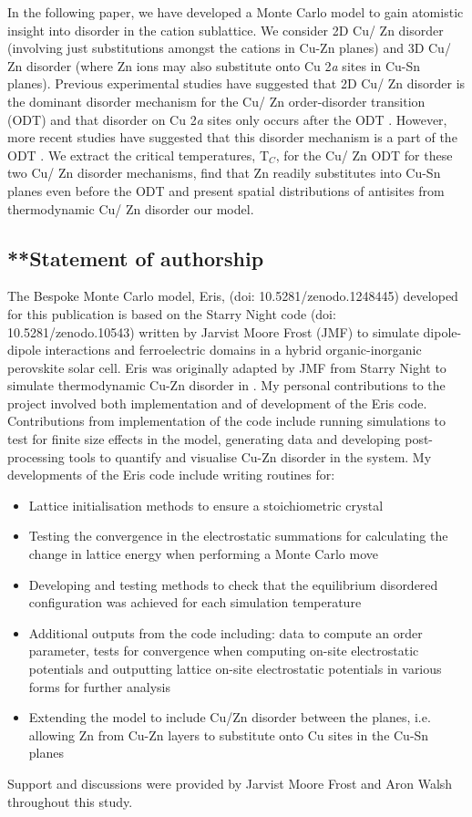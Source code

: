 \documentclass[11pt, twoside]{report}
\begin{document}
In the following paper, we have developed a Monte Carlo model to gain atomistic insight into disorder in the cation sublattice. We consider 2D Cu/ Zn disorder (involving just substitutions amongst the cations in Cu-Zn planes) and 3D Cu/ Zn disorder (where Zn ions may also substitute onto Cu 2\textit{a} sites in Cu-Sn planes). 
Previous experimental studies have suggested that 2D Cu/ Zn disorder is the dominant disorder mechanism for the Cu/ Zn order-disorder transition (ODT) and that disorder on Cu 2\textit{a} sites only occurs after the ODT \cite{disorder_july}. However, more recent studies have suggested that this disorder mechanism is a part of the ODT \cite{Cu2a_expt, Cu2a_theory}.
We extract the critical temperatures, T$_C$, for the Cu/ Zn ODT for these two Cu/ Zn disorder mechanisms, find that Zn readily substitutes into Cu-Sn planes even before the ODT and present spatial distributions of antisites from thermodynamic Cu/ Zn disorder our model.

\subsection{**Statement of authorship}
The Bespoke Monte Carlo model, Eris, (doi: 10.5281/zenodo.1248445) developed for this publication is based on the Starry Night code (doi: 10.5281/zenodo.10543) written by Jarvist Moore Frost (JMF) to simulate dipole-dipole interactions and ferroelectric domains in a hybrid organic-inorganic perovskite solar cell. Eris was originally adapted by JMF from Starry Night to simulate thermodynamic Cu-Zn disorder in {\CZTS}. My personal contributions to the project involved both implementation and of development of the Eris code. Contributions from implementation of the code include running simulations to test for finite size effects in the model, generating data and developing post-processing tools to quantify and visualise Cu-Zn disorder in the system. My developments of the Eris code include writing routines for:
\begin{itemize}
    \item Lattice initialisation methods to ensure a stoichiometric {\CZTS} crystal
    \item Testing the convergence in the electrostatic summations for calculating the change in lattice energy when performing a Monte Carlo move
    \item Developing and testing methods to check that the equilibrium disordered configuration was achieved for each simulation temperature
    \item Additional outputs from the code including: data to compute an order parameter, tests for convergence when computing on-site electrostatic potentials and outputting lattice on-site electrostatic potentials in various forms for further analysis
    \item Extending the model to include Cu/Zn disorder between the planes, i.e. allowing Zn from Cu-Zn layers to substitute onto Cu sites in the Cu-Sn planes
\end{itemize}
Support and discussions were provided by Jarvist Moore Frost and Aron Walsh throughout this study.
\end{document}
